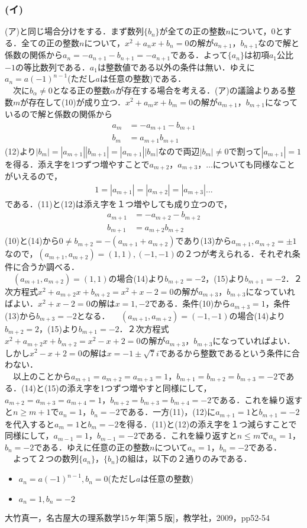\documentclass[../main]{subfiles}
\begin{document}
\subsubsection*{(イ)}
(ア)と同じ場合分けをする．まず数列$\{b_n\}$が全ての正の整数$n$について，0とする．全ての正の整数$n$について，$x^{2}+a_{n}x+b_{n}=0$の解が$a_{n+1}$，$b_{n+1}$なので解と係数の関係から$a_n=-a_{n+1}-b_{n+1}=-a_{n+1}$である．よって$\{a_n\}$は初項$a_1$公比$-1$の等比数列である．$a_1$は整数値である以外の条件は無い．ゆえに$a_n=a(-1)^{n-1}$(ただし$a$は任意の整数)である．\\
　次に$b_\alpha\ne0$となる正の整数$\alpha$が存在する場合を考える．(ア)の議論よりある整数$m$が存在して(10)が成り立つ．$x^{2}+a_mx+b_m=0$の解が$a_{m+1}$，$b_{m+1}$になっているので解と係数の関係から
\begin{align}
a_{m}&=-a_{m+1}-b_{m+1}\\
b_{m}&=a_{m+1}b_{m+1}
\end{align}
(12)より$|b_m|=|a_{m+1}||b_{m+1}|=|a_{m+1}||b_m|$なので両辺$|b_m|\ne0$で割って$|a_{m+1}|=1$を得る．添え字を1つずつ増やすことで$a_{m+2}$，$a_{m+3}，\dots$についても同様なことがいえるので，
\begin{align}
1=|a_{m+1}|=|a_{m+2}|=|a_{m+3}|\dots
\end{align}
である．(11)と(12)は添え字を１つ増やしても成り立つので，
\begin{align}
a_{m+1}&=-a_{m+2}-b_{m+2}\\
b_{m+1}&=a_{m+2}b_{m+2}
\end{align}
(10)と(14)から$0\ne b_{m+2}=-(a_{m+1}+a_{m+2})$であり(13)から$a_{m+1},a_{m+2}=\pm1$なので，$(a_{m+1},a_{m+2})=(1,1),(-1,-1)$の２つが考えられる．それぞれ条件に合うか調べる．\\
　$(a_{m+1},a_{m+2})=(1,1)$の場合(14)より$b_{m+2}=-2$，(15)より$b_{m+1}=-2$．２次方程式$x^{2}+a_{m+2}x+b_{m+2}=x^{2}+x-2=0$の解が$a_{m+3}$，$b_{m+3}$になっていればよい．$x^{2}+x-2=0$の解は$x=1,-2$である．条件(10)から$a_{m+3}=1$，条件(13)から$b_{m+3}=-2$となる．
　$(a_{m+1},a_{m+2})=(-1,-1)$の場合(14)より$b_{m+2}=2$，(15)より$b_{m+1}=-2$．２次方程式$x^{2}+a_{m+2}x+b_{m+2}=x^{2}-x+2=0$の解が$a_{m+3}$，$b_{m+3}$になっていればよい．しかし$x^{2}-x+2=0$の解は$x=-1\pm\sqrt{7}i$であるから整数であるという条件に合わない．\\
　以上のことから$a_{m+1}=a_{m+2}=a_{m+3}=1$，$b_{m+1}=b_{m+2}=b_{m+3}=-2$である．(14)と(15)の添え字を1つずつ増やすと同様にして，$a_{m+2}=a_{m+3}=a_{m+4}=1$，$b_{m+2}=b_{m+3}=b_{m+4}=-2$である．これを繰り返すと$n\ge m+1$で$a_n=1$，$b_n=-2$である．一方(11)，(12)に$a_{m+1}=1$と$b_{m+1}=-2$を代入すると$a_m=1$と$b_m=-2$を得る．(11)と(12)の添え字を１つ減らすことで同様にして，$a_{m-1}=1$，$b_{m-1}=-2$である．これを繰り返すと$n\le m$で$a_n=1$，$b_n=-2$である．ゆえに任意の正の整数$n$について$a_n=1$，$b_n=-2$である．\\
　よって２つの数列$\{a_n\}$，$\{b_n\}$の組は，以下の２通りのみである．
\begin{itemize}
\item $a_n=a(-1)^{n-1},b_n=0$(ただし$a$は任意の整数)
\item $a_n=1,b_n=-2$
\end{itemize}
\begin{thebibliography}{9}
大竹真一，名古屋大の理系数学15ヶ年[第５版]，教学社，2009，pp52-54
\end{thebibliography}
\end{document}
